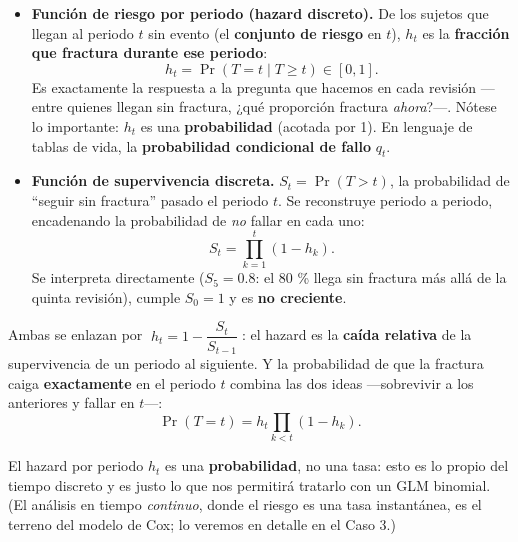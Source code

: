 \documentclass[
  letterpaper,
  DIV=11,
  numbers=noendperiod]{scrartcl}
\begin{document}
\begin{itemize}
\item
  \textbf{Función de riesgo por periodo (hazard discreto).} De los
  sujetos que llegan al periodo \(t\) sin evento (el \textbf{conjunto de
  riesgo} en \(t\)), \(h_t\) es la \textbf{fracción que fractura durante
  ese periodo}: \[
  h_t=\Pr(T=t\mid T\ge t)\in[0,1].
  \] Es exactamente la respuesta a la pregunta que hacemos en cada
  revisión ---entre quienes llegan sin fractura, ¿qué proporción
  fractura \emph{ahora}?---. Nótese lo importante: \(h_t\) es una
  \textbf{probabilidad} (acotada por 1). En lenguaje de tablas de vida,
  la \textbf{probabilidad condicional de fallo} \(q_t\).
\item
  \textbf{Función de supervivencia discreta.} \(S_t=\Pr(T>t)\), la
  probabilidad de ``seguir sin fractura'' pasado el periodo \(t\). Se
  reconstruye periodo a periodo, encadenando la probabilidad de
  \emph{no} fallar en cada uno: \[
  S_t=\prod_{k=1}^{t}(1-h_k).
  \] Se interpreta directamente (\(S_5=0.8\): el 80 \% llega sin
  fractura más allá de la quinta revisión), cumple \(S_0=1\) y es
  \textbf{no creciente}.
\end{itemize}

Ambas se enlazan por \(\;h_t=1-\dfrac{S_t}{S_{t-1}}\;\): el hazard es la
\textbf{caída relativa} de la supervivencia de un periodo al siguiente.
Y la probabilidad de que la fractura caiga \textbf{exactamente} en el
periodo \(t\) combina las dos ideas ---sobrevivir a los anteriores y
fallar en \(t\)---: \[
\Pr(T=t)=h_t\prod_{k<t}(1-h_k).
\]

\begin{tcolorbox}[enhanced jigsaw, breakable, colframe=quarto-callout-note-color-frame, left=2mm, arc=.35mm, colbacktitle=quarto-callout-note-color!10!white, toprule=.15mm, colback=white, coltitle=black, rightrule=.15mm, opacitybacktitle=0.6, title=\textcolor{quarto-callout-note-color}{\faInfo}\hspace{0.5em}{Un apunte}, titlerule=0mm, toptitle=1mm, bottomtitle=1mm, leftrule=.75mm, bottomrule=.15mm, opacityback=0]

El hazard por periodo \(h_t\) es una \textbf{probabilidad}, no una tasa:
esto es lo propio del tiempo discreto y es justo lo que nos permitirá
tratarlo con un GLM binomial. (El análisis en tiempo \emph{continuo},
donde el riesgo es una tasa instantánea, es el terreno del modelo de
Cox; lo veremos en detalle en el Caso 3.)

\end{tcolorbox}
\end{document}
